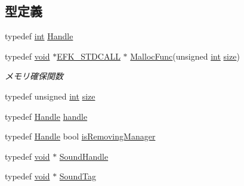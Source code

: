 \subsection*{型定義}
\begin{DoxyCompactItemize}
\item 
typedef \mbox{\hyperlink{namespace_effekseer_ace0abf7c2e6947e519ebe8b54cbcc30a}{int}} \mbox{\hyperlink{namespace_effekseer_afba58b8d812da862190e9bbfc040824a}{Handle}}
\item 
typedef \mbox{\hyperlink{namespace_effekseer_ab34c4088e512200cf4c2716f168deb56}{void}} $\ast$\mbox{\hyperlink{_effekseer_8h_a4b2fd0bd069299f55649055bbd485d7f}{E\+F\+K\+\_\+\+S\+T\+D\+C\+A\+LL}} $\ast$ \mbox{\hyperlink{namespace_effekseer_a2f9a04a7b2d08a8f2173ce47e57ff742}{Malloc\+Func}}(unsigned \mbox{\hyperlink{namespace_effekseer_ace0abf7c2e6947e519ebe8b54cbcc30a}{int}} \mbox{\hyperlink{namespace_effekseer_a73c68f3d33539d30844b9d1e058077f7}{size}})
\begin{DoxyCompactList}\small\item\em メモリ確保関数 \end{DoxyCompactList}\item 
typedef unsigned \mbox{\hyperlink{namespace_effekseer_ace0abf7c2e6947e519ebe8b54cbcc30a}{int}} \mbox{\hyperlink{namespace_effekseer_a73c68f3d33539d30844b9d1e058077f7}{size}}
\item 
typedef \mbox{\hyperlink{namespace_effekseer_afba58b8d812da862190e9bbfc040824a}{Handle}} \mbox{\hyperlink{namespace_effekseer_afd99b336b206999bdcca3e431648efbc}{handle}}
\item 
typedef \mbox{\hyperlink{namespace_effekseer_afba58b8d812da862190e9bbfc040824a}{Handle}} bool \mbox{\hyperlink{namespace_effekseer_a153d1bcf5fd3c14124e04d0dadf6827c}{is\+Removing\+Manager}}
\item 
typedef \mbox{\hyperlink{namespace_effekseer_ab34c4088e512200cf4c2716f168deb56}{void}} $\ast$ \mbox{\hyperlink{namespace_effekseer_a694a300b9b688ca40f6a0d9841d437bf}{Sound\+Handle}}
\item 
typedef \mbox{\hyperlink{namespace_effekseer_ab34c4088e512200cf4c2716f168deb56}{void}} $\ast$ \mbox{\hyperlink{namespace_effekseer_adb219197297396cf2ab9bee657551a29}{Sound\+Tag}}
\end{DoxyCompactItemize}
